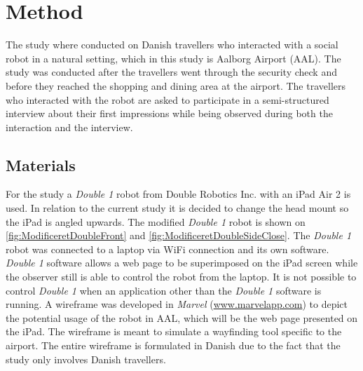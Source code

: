 \section{Method}
\label{Method}
%
The study where conducted on Danish travellers who interacted with a social robot in a natural setting, which in this study is Aalborg Airport (AAL). The study was conducted after the travellers went through the security check and before they reached the shopping and dining area at the airport. The travellers who interacted with the robot are asked to participate in a semi-structured interview about their first impressions while being observed during both the interaction and the interview. 

\subsection{Materials}
For the study a \textit{Double 1} robot from Double Robotics Inc. with an iPad Air 2 is used. In relation to the current study it is decided to change the head mount so the iPad is angled upwards. The modified \textit{Double 1} robot is shown on \autoref{fig:ModificeretDoubleFront} and \autoref{fig:ModificeretDoubleSideClose}. The \textit{Double 1} robot was connected to a laptop via WiFi connection and its own software. \textit{Double 1} software allows a web page to be superimposed on the iPad screen while the observer still is able to control the robot from the laptop. It is not possible to control \textit{Double 1} when an application other than the \textit{Double 1} software is running. A wireframe was developed in \textit{Marvel} (\url{www.marvelapp.com}) to depict the potential usage of the robot in AAL, which will be the web page presented on the iPad. The wireframe is meant to simulate a wayfinding tool specific to the airport. The entire wireframe is formulated in Danish due to the fact that the study only involves Danish travellers.
%
